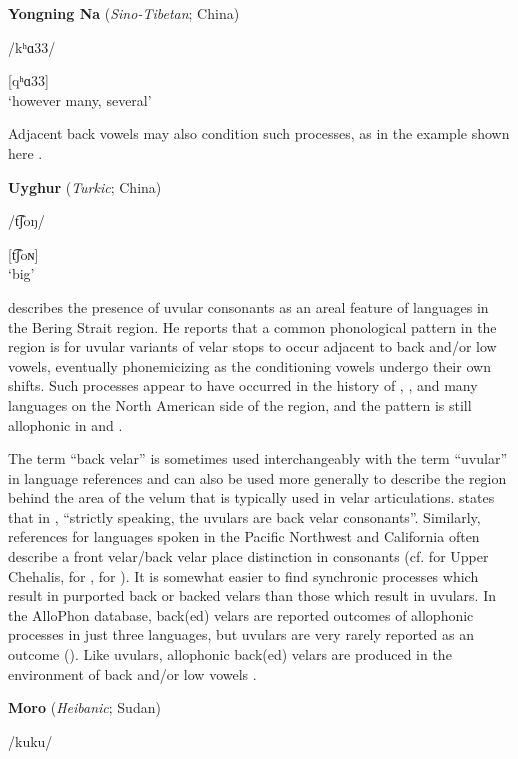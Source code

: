 \ea\label{ex:4.39}
  \textbf{Yongning Na} (\textit{Sino-Tibetan}; China)

/kʰɑ33/

[qʰɑ33]\\
\glt ‘however many, several’
\citep[80]{Lidz2010}
\z

Adjacent back vowels may also condition such processes, as in the  example shown here .

\ea\label{ex:4.40}
  \textbf{Uyghur} (\textit{Turkic}; China)

/t͡ʃoŋ/

[t͡ʃoɴ]\\
\glt ‘big’
\citep[76]{Hahn1991}
\z

  \citet[72,91]{Fortescue1998} describes the presence of uvular consonants as an areal feature of languages in the Bering Strait region. He reports that a common phonological pattern in the region is for uvular variants of velar stops to occur adjacent to back and/or low vowels, eventually phonemicizing as the conditioning vowels undergo their own shifts. Such processes appear to have occurred in the history of , , and many languages on the North American side of the region, and the pattern is still allophonic in  and .

  The term ``back velar'' is sometimes used interchangeably with the term ``uvular'' in language references and can also be used more generally to describe the region behind the area of the velum that is typically used in velar articulations. \citet[20]{VandenBerg1995} states that in , “strictly speaking, the uvulars are back velar consonants”. Similarly, references for languages spoken in the Pacific Northwest and California often describe a front velar/back velar place distinction in consonants (cf. \citealt{Kinkade1963} for Upper Chehalis, \citealt{Harris1981} for , \citealt{Golla1970} for ). It is somewhat easier to find synchronic processes which result in purported back or backed velars than those which result in uvulars. In the AlloPhon database, back(ed) velars are reported outcomes of allophonic processes in just three languages, but uvulars are very rarely reported as an outcome (\citealt{BybeeEasterday2019}). Like uvulars, allophonic back(ed) velars are produced in the environment of back and/or low vowels .

\ea\label{ex:4.41}
  \textbf{Moro} (\textit{Heibanic}; Sudan)

/kuku/


